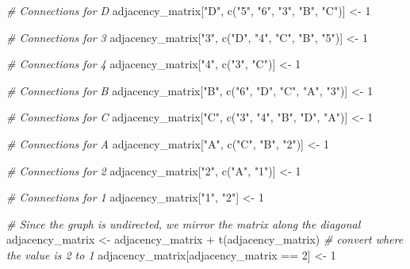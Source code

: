 \documentclass[
]{article}
\newenvironment{Shaded}{\begin{snugshade}}{\end{snugshade}}
\newcommand{\CommentTok}[1]{\textcolor[rgb]{0.56,0.35,0.01}{\textit{#1}}}
\newcommand{\DecValTok}[1]{\textcolor[rgb]{0.00,0.00,0.81}{#1}}
\newcommand{\FunctionTok}[1]{\textcolor[rgb]{0.00,0.00,0.00}{#1}}
\newcommand{\NormalTok}[1]{#1}
\newcommand{\OtherTok}[1]{\textcolor[rgb]{0.56,0.35,0.01}{#1}}
\newcommand{\SpecialCharTok}[1]{\textcolor[rgb]{0.00,0.00,0.00}{#1}}
\newcommand{\StringTok}[1]{\textcolor[rgb]{0.31,0.60,0.02}{#1}}
\begin{document}
\begin{Shaded}
\begin{Highlighting}[]
\CommentTok{\# Connections for D}
\NormalTok{adjacency\_matrix[}\StringTok{"D"}\NormalTok{, }\FunctionTok{c}\NormalTok{(}\StringTok{"5"}\NormalTok{, }\StringTok{"6"}\NormalTok{, }\StringTok{"3"}\NormalTok{, }\StringTok{"B"}\NormalTok{, }\StringTok{"C"}\NormalTok{)] }\OtherTok{\textless{}{-}} \DecValTok{1}

\CommentTok{\# Connections for 3}
\NormalTok{adjacency\_matrix[}\StringTok{"3"}\NormalTok{, }\FunctionTok{c}\NormalTok{(}\StringTok{"D"}\NormalTok{, }\StringTok{"4"}\NormalTok{, }\StringTok{"C"}\NormalTok{, }\StringTok{"B"}\NormalTok{, }\StringTok{"5"}\NormalTok{)] }\OtherTok{\textless{}{-}} \DecValTok{1}

\CommentTok{\# Connections for 4}
\NormalTok{adjacency\_matrix[}\StringTok{"4"}\NormalTok{, }\FunctionTok{c}\NormalTok{(}\StringTok{"3"}\NormalTok{, }\StringTok{"C"}\NormalTok{)] }\OtherTok{\textless{}{-}} \DecValTok{1}

\CommentTok{\# Connections for B}
\NormalTok{adjacency\_matrix[}\StringTok{"B"}\NormalTok{, }\FunctionTok{c}\NormalTok{(}\StringTok{"6"}\NormalTok{, }\StringTok{"D"}\NormalTok{, }\StringTok{"C"}\NormalTok{, }\StringTok{"A"}\NormalTok{, }\StringTok{"3"}\NormalTok{)] }\OtherTok{\textless{}{-}} \DecValTok{1}

\CommentTok{\# Connections for C}
\NormalTok{adjacency\_matrix[}\StringTok{"C"}\NormalTok{, }\FunctionTok{c}\NormalTok{(}\StringTok{"3"}\NormalTok{, }\StringTok{"4"}\NormalTok{, }\StringTok{"B"}\NormalTok{, }\StringTok{"D"}\NormalTok{, }\StringTok{"A"}\NormalTok{)] }\OtherTok{\textless{}{-}} \DecValTok{1}

\CommentTok{\# Connections for A}
\NormalTok{adjacency\_matrix[}\StringTok{"A"}\NormalTok{, }\FunctionTok{c}\NormalTok{(}\StringTok{"C"}\NormalTok{, }\StringTok{"B"}\NormalTok{, }\StringTok{"2"}\NormalTok{)] }\OtherTok{\textless{}{-}} \DecValTok{1}

\CommentTok{\# Connections for 2}
\NormalTok{adjacency\_matrix[}\StringTok{"2"}\NormalTok{, }\FunctionTok{c}\NormalTok{(}\StringTok{"A"}\NormalTok{, }\StringTok{"1"}\NormalTok{)] }\OtherTok{\textless{}{-}} \DecValTok{1}

\CommentTok{\# Connections for 1}
\NormalTok{adjacency\_matrix[}\StringTok{"1"}\NormalTok{, }\StringTok{"2"}\NormalTok{] }\OtherTok{\textless{}{-}} \DecValTok{1}

\CommentTok{\# Since the graph is undirected, we mirror the matrix along the diagonal}
\NormalTok{adjacency\_matrix }\OtherTok{\textless{}{-}}\NormalTok{ adjacency\_matrix }\SpecialCharTok{+} \FunctionTok{t}\NormalTok{(adjacency\_matrix)}
\CommentTok{\# convert where the value is 2 to 1}
\NormalTok{adjacency\_matrix[adjacency\_matrix }\SpecialCharTok{==} \DecValTok{2}\NormalTok{] }\OtherTok{\textless{}{-}} \DecValTok{1}


\end{Highlighting}
\end{Shaded}
\end{document}
